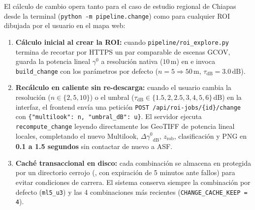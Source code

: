\documentclass[11pt,a4paper]{article}
\newcommand{\src}[1]{\nolinkurl{#1}}
\newcommand{\unit}[1]{\mathrm{#1}}
\newcommand{\gz}{\ensuremath{\gamma^{0}}}
\begin{document}
El cálculo de cambio opera tanto para el caso de estudio regional de Chiapas desde la terminal
(\texttt{python -m pipeline.change}) como para cualquier ROI dibujada por el usuario en el mapa web:
\begin{enumerate}
  \item \textbf{Cálculo inicial al crear la ROI:} cuando \src{pipeline/roi_explore.py} termina de recortar por
        HTTPS un par comparable de escenas GCOV, guarda la potencia lineal $\gz$ a resolución nativa ($10\,\unit{m}$)
        en  e invoca \texttt{build\_change} con los
        parámetros por defecto ($n=5 \Rightarrow 50\,\unit{m}$, $\tau_{\mathrm{dB}} = 3.0\,\unit{dB}$).
  \item \textbf{Recálculo en caliente sin re-descarga:} cuando el usuario cambia la resolución
        ($n \in \{2, 5, 10\}$) o el umbral ($\tau_{\mathrm{dB}} \in \{1.5, 2, 2.5, 3, 4, 5, 6\}\,\unit{dB}$)
        en la interfaz, el frontend envía una petición \texttt{POST /api/roi-jobs/\{id\}/change} con
        \texttt{\{"multilook": n, "umbral\_dB": u\}}. El servidor ejecuta \texttt{recompute\_change} leyendo
        directamente los GeoTIFF de potencia lineal locales, completando el nuevo Multilook, $\Delta\gz_{\mathrm{dB}}$,
        $z_{\mathrm{rob}}$, clasificación y PNG en \textbf{0.1 a 1.5 segundos} sin contactar de nuevo a ASF.
  \item \textbf{Caché transaccional en disco:} cada combinación se almacena en
         protegida por un directorio cerrojo (, con
        expiración de 5 minutos ante fallos) para evitar condiciones de carrera. El sistema conserva siempre la
        combinación por defecto (\texttt{ml5\_u3}) y las 4 combinaciones más recientes (\texttt{CHANGE\_CACHE\_KEEP = 4}).
\end{enumerate}
\end{document}
